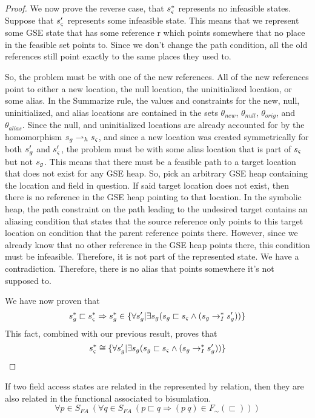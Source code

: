 \begin{proof}
We now prove the reverse case, that $s_{\varsigma}^*$ represents no infeasible states. Suppose that $s_{\varsigma}^\prime$ represents some infeasible state. This means that we represent some GSE state that has some reference r which points somewhere that no place in the feasible set points to. Since we don't change the path condition, all the old references still point exactly to the same places they used to. 

So, the problem must be with one of the new references. All of the new references point to either a new location, the null location, the uninitialized location, or some alias. In the Summarize rule, the values and constraints for the new, null, uninitialized, and alias locations are contained in the sets $\theta_{new}$, $\theta_{null}$, $\theta_\mathit{orig}$, and $\theta_{alias}$. Since the null, and uninitialized locations are already accounted for by the homomorphism $s_{g} \rightharpoonup_h s_{\varsigma}$, and since a new location was created symmetrically for both $s_{g}^\prime$ and $s_{\varsigma}^\prime$, the problem must be with some alias location that is part of $s_{\varsigma}$ but not $s_{g}$. This means that there must be a feasible path to a target location that does not exist for any GSE heap. So, pick an arbitrary GSE heap containing the location and field in question. If said target location does not exist, then there is no reference in the GSE heap pointing to that location. In the symbolic heap, the path constraint on the path leading to the undesired target contains an aliasing condition that states that the source reference only points to this target location on condition that the parent reference points there. However, since we already know that no other reference in the GSE heap points there, this condition must be infeasible. Therefore, it is not part of the represented state. We have a contradiction. Therefore, there is no alias that points somewhere it's not supposed to.

We have now proven that 
$$ s_{g}^* \sqsubset s_{\varsigma}^*  \Rightarrow  s_{g}^* \in \{\forall s_{g}^\prime | \exists s_{g} (s_{g} \sqsubset s_{\varsigma} \wedge (s_{g} \rightarrow_I^* s_{g}^\prime) ) \}$$
This fact, combined with our previous result, proves that
$$s_{\varsigma}^*  \cong \{\forall s_{g}^\prime | \exists s_{g} (s_{g} \sqsubset s_{\varsigma} \wedge (s_{g} \rightarrow_I^* s_{g}^\prime) ) \}$$

\end{proof}

\begin{lemma}
If two field access states are related in the represented by relation,
then they are also related in the functional associated to bisumlation.
\label{lem:access}
$$
\forall p \in S_\mathit{FA}\ (\forall q \in S_\mathit{FA}\ (p \sqsubset q \Rightarrow (p\ q) \in F_\sim(\sqsubset)))
$$
\end{lemma}

